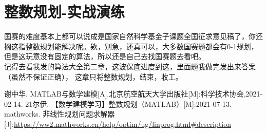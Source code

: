\documentclass[a4paper,20pt]{article}
\begin{document}
    \section{整数规划-实战演练}
    国赛的难度基本上都可以说成是国家自然科学基金子课题全国征求意见稿了，你还搁这指整数规划能解决呢。欸，别急，还真可以，大多数国赛题都会有0-1规划，但是这玩意没有固定的算法，所以还是自己去找国赛题去看吧。
    \\记得去看我发的算法大全第二章，这波保底进度到这，里面题我做完发出来答案（虽然不保证正确），
    这章只将整数规划，结束，收工。



    \newpage
\begin{thebibliography}{99}  

    谢中华. MATLAB与数学建模[A].北京航空航天大学出版社[M]:科学技术协会,2021-02-14.
    21尔伊. 【数学建模学习】整数规划（MATLAB）[M]:2021-07-13.
    mathworks. 非线性规划问题求解器[J]:\url{https://ww2.mathworks.cn/help/optim/ug/linprog.html#description}
    
    \end{thebibliography}

    \newpage
\end{document}
